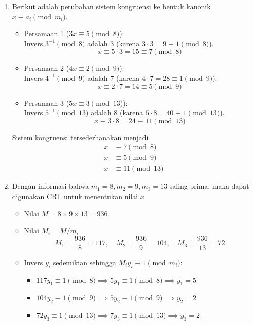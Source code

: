 \documentclass[12pt,a4paper]{article}
\begin{document}
\begin{enumerate}[label=(\alph*)]
    \item Berikut adalah perubahan sistem kongruensi ke bentuk kanonik $x \equiv a_i \pmod{m_i}$.
    \begin{itemize}
        \item Persamaan 1 ($3x \equiv 5 \pmod 8$): \\
        Invers $3^{-1} \pmod 8$ adalah $3$ (karena $3 \cdot 3 = 9 \equiv 1 \pmod 8$).
        \[ x \equiv 5 \cdot 3 = 15 \equiv 7 \pmod 8 \]
        
        \item Persamaan 2 ($4x \equiv 2 \pmod 9$): \\
        Invers $4^{-1} \pmod 9$ adalah $7$ (karena $4 \cdot 7 = 28 \equiv 1 \pmod 9$).
        \[ x \equiv 2 \cdot 7 = 14 \equiv 5 \pmod 9 \]
        
        \item Persamaan 3 ($5x \equiv 3 \pmod{13}$): \\
        Invers $5^{-1} \pmod{13}$ adalah $8$ (karena $5 \cdot 8 = 40 \equiv 1 \pmod{13}$).
        \[ x \equiv 3 \cdot 8 = 24 \equiv 11 \pmod{13} \]
    \end{itemize}
    Sistem kongruensi tersederhanakan menjadi
    \begin{align*}
        x &\equiv 7 \pmod 8 \\
        x &\equiv 5 \pmod 9 \\
        x &\equiv 11 \pmod{13}
    \end{align*}

    \item Dengan informasi bahwa $m_1 = 8, m_2 = 9, m_3 = 13$ saling prima, maka dapat digunakan CRT untuk menentukan nilai $x$
    \begin{itemize}
        \item Nilai $M = 8 \times 9 \times 13 = 936$.
        \item Nilai $M_i = M / m_i$
        \[ M_1 = \frac{936}{8} = 117, \quad M_2 = \frac{936}{9} = 104, \quad M_3 = \frac{936}{13} = 72 \]
        
        \item Invers $y_i$ sedemikian sehingga $M_i y_i \equiv 1 \pmod{m_i}$:
        \begin{itemize}
            \item $117 y_1 \equiv 1 \pmod 8 \implies 5 y_1 \equiv 1 \pmod 8 \implies y_1 = 5$
            \item $104 y_2 \equiv 1 \pmod 9 \implies 5 y_2 \equiv 1 \pmod 9 \implies y_2 = 2$
            \item $72 y_3 \equiv 1 \pmod{13} \implies 7 y_3 \equiv 1 \pmod{13} \implies y_3 = 2$
        \end{itemize}
        

\end{itemize}
\end{enumerate}
\end{document}
